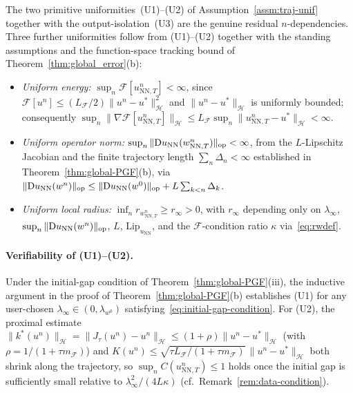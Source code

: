 \documentclass[twoside,11pt]{article}
\newcommand{\D}{\mathrm{D}}
\newcommand{\NN}{\mathrm{NN}}
\newcommand{\Lip}{\mathrm{Lip}}
\newcommand{\calF}{\mathcal{F}}
\newcommand{\calH}{\mathcal{H}}
\begin{document}
The two primitive uniformities~(U1)--(U2) of Assumption~\ref{assm:traj-unif} together with the output-isolation~(U3) are the genuine residual $n$-dependencies. Three further uniformities follow from (U1)--(U2) together with the standing assumptions and the function-space tracking bound of Theorem~\ref{thm:global_error}(b):
\begin{itemize}[leftmargin=*,nosep]
\item \emph{Uniform energy:} $\sup_n\calF[u^n_{\NN,T}]<\infty$, since $\calF[u^n]\le(L_\calF/2)\|u^n-u^*\|_\calH^{2}$ and $\|u^n-u^*\|_\calH$ is uniformly bounded; consequently $\sup_n\|\nabla\calF[u^n_{\NN,T}]\|_\calH\le L_\calF\sup_n\|u^n_{\NN,T}-u^*\|_\calH<\infty$.
\item \emph{Uniform operator norm:} $\sup_n\|\D u_\NN(w^n_{\NN,T})\|_{\rm op}<\infty$, from the $L$-Lipschitz Jacobian and the finite trajectory length $\sum_n\Delta_n<\infty$ established in Theorem~\ref{thm:global-PGF}(b), via $\|\D u_\NN(w^n)\|_{\rm op}\le\|\D u_\NN(w^0)\|_{\rm op}+L\sum_{k<n}\Delta_k$.
\item \emph{Uniform local radius:} $\inf_n r_{w^n_{\NN,T}}\ge r_\infty>0$, with $r_\infty$ depending only on $\lambda_\infty$, $\sup_n\|\D u_\NN(w^n)\|_{\rm op}$, $L$, $\Lip_{u_\NN}$, and the $\calF$-condition ratio $\kappa$ via~\eqref{eq:rwdef}.
\end{itemize}

\paragraph{Verifiability of (U1)--(U2).}
Under the initial-gap condition of Theorem~\ref{thm:global-PGF}(iii), the inductive argument in the proof of Theorem~\ref{thm:global-PGF}(b) establishes (U1) for any user-chosen $\lambda_\infty\in(0,\lambda_{w^0})$ satisfying~\eqref{eq:initial-gap-condition}. For (U2), the proximal estimate $\|k^*(u^n)\|_\calH=\|J_\tau(u^n)-u^n\|_\calH\le(1+\rho)\|u^n-u^*\|_\calH$ (with $\rho=1/(1+\tau m_\calF)$) and $K(u^n)\le\sqrt{\tau L_\calF/(1+\tau m_\calF)}\,\|u^n-u^*\|_\calH$ both shrink along the trajectory, so $\sup_n C(u^n_{\NN,T})\le 1$ holds once the initial gap is sufficiently small relative to $\lambda_\infty^{2}/(4L\kappa)$ (cf.\ Remark~\ref{rem:data-condition}).
\end{document}
